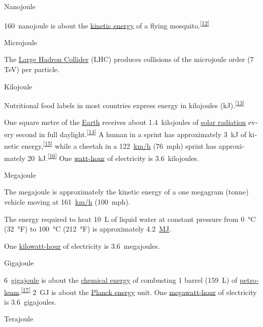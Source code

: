 \documentclass[
]{article}
\newenvironment{LTR}{\beginL}{\endL}
\begin{document}
\begin{LTR}
\begin{otherlanguage}{english}
{\label{Nanojoule}{}{Nanojoule}}

{{}160~nanojoule} is about the \href{/wiki/Kinetic_energy}{kinetic
energy} of a flying
mosquito.\textsuperscript{\hyperref[cite_note-13]{{[}12{]}}}

{\label{Microjoule}{}{Microjoule}}

The \href{/wiki/Large_Hadron_Collider}{Large Hadron Collider} (LHC)
produces collisions of the microjoule order (7 TeV) per particle.

{\label{Kilojoule}{}{Kilojoule}}

Nutritional food labels in most countries express energy in kilojoules
(kJ).\textsuperscript{\hyperref[cite_note-Cal_vs_kJ-14]{{[}13{]}}}

One square metre of the \href{/wiki/Earth}{Earth} receives about
{{}1.4~kilojoules} of \href{/wiki/Sunlight\#Solar_constant}{solar
radiation} every second in full
daylight.\textsuperscript{\hyperref[cite_note-TSI-15]{{[}14{]}}} A human
in a sprint has approximately 3~kJ of kinetic
energy,\textsuperscript{\hyperref[cite_note-16]{{[}15{]}}} while a
cheetah in a {{}122~\href{/wiki/Kilometres_per_hour}{km/h}} (76~mph)
sprint has approximately
20~kJ.\textsuperscript{\hyperref[cite_note-17]{{[}16{]}}} One
\href{/wiki/Watt-hour}{watt-hour} of electricity is {{}3.6~kilojoules}.

{\label{Megajoule}{}{Megajoule}}

The megajoule is approximately the kinetic energy of a one megagram
(tonne) vehicle moving at {{}161~\href{/wiki/Kilometres_per_hour}{km/h}}
(100~mph).

The energy required to heat {{}10~L} of liquid water at constant
pressure from 0~°C (32~°F) to 100~°C (212~°F) is approximately
{{}4.2~\href{/wiki/Megajoule}{MJ}}.

One \href{/wiki/Kilowatt-hour}{kilowatt-hour} of electricity is
{{}3.6~megajoules}.

{\label{Gigajoule}{}{Gigajoule}}

{{}6~\href{/wiki/Gigajoule}{gigajoule}} is about the
\href{/wiki/Chemical_energy}{chemical energy} of combusting 1 barrel
(159~L) of
\href{/wiki/Petroleum}{petroleum}.\textsuperscript{\hyperref[cite_note-18]{{[}17{]}}}
2~GJ is about the \href{/wiki/Planck_units}{Planck energy} unit. One
\href{/wiki/Megawatt-hour}{megawatt-hour} of electricity is
{{}3.6~gigajoules}.

{\label{Terajoule}{}{Terajoule}}


\end{otherlanguage}
\end{LTR}
\end{document}
